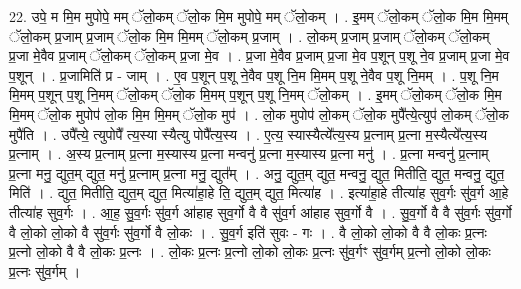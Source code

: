 \documentclass[17pt]{extarticle}
\begin{document}
22. उपे॒ म मि॒म मुपोपे॒ मम् ॅलो॒कम् ॅलो॒क मि॒म मुपोपे॒ मम् ॅलो॒कम् । . इ॒मम् ॅलो॒कम् ॅलो॒क मि॒म मि॒मम् ॅलो॒कम् प्र॒जाम् प्र॒जाम् ॅलो॒क मि॒म मि॒मम् ॅलो॒कम् प्र॒जाम् । . लो॒कम् प्र॒जाम् प्र॒जाम् ॅलो॒कम् ॅलो॒कम् प्र॒जा मे॒वैव प्र॒जाम् ॅलो॒कम् ॅलो॒कम् प्र॒जा मे॒व । . प्र॒जा मे॒वैव प्र॒जाम् प्र॒जा मे॒व प॒शून् प॒शू ने॒व प्र॒जाम् प्र॒जा मे॒व प॒शून् । . प्र॒जामिति॑ प्र - जाम् । . ए॒व प॒शून् प॒शू ने॒वैव प॒शू नि॒म मि॒मम् प॒शू ने॒वैव प॒शू नि॒मम् । . प॒शू नि॒म मि॒मम् प॒शून् प॒शू नि॒मम् ॅलो॒कम् ॅलो॒क मि॒मम् प॒शून् प॒शू नि॒मम् ॅलो॒कम् । . इ॒मम् ॅलो॒कम् ॅलो॒क मि॒म मि॒मम् ॅलो॒क मुपोप॑ लो॒क मि॒म मि॒मम् ॅलो॒क मुप॑ । . लो॒क मुपोप॑ लो॒कम् ॅलो॒क मुपै᳚त्ये॒त्युप॑ लो॒कम् ॅलो॒क मुपै॑ति । . उपै᳚त्ये॒ त्युपोपै᳚ त्य॒स्या स्यैत्यु पोपै᳚त्य॒स्य । . ए॒त्य॒ स्यास्यैत्ये᳚त्य॒स्य प्र॒त्नाम् प्र॒त्ना म॒स्यैत्ये᳚त्य॒स्य प्र॒त्नाम् । . अ॒स्य प्र॒त्नाम् प्र॒त्ना म॒स्यास्य प्र॒त्ना मन्वनु॑ प्र॒त्ना म॒स्यास्य प्र॒त्ना मनु॑ । . प्र॒त्ना मन्वनु॑ प्र॒त्नाम् प्र॒त्ना मनु॒ द्युत॒म् द्युत॒ मनु॑ प्र॒त्नाम् प्र॒त्ना मनु॒ द्युत᳚म् । . अनु॒ द्युत॒म् द्युत॒ मन्वनु॒ द्युत॒ मितीति॒ द्युत॒ मन्वनु॒ द्युत॒ मिति॑ । . द्युत॒ मितीति॒ द्युत॒म् द्युत॒ मित्या॑हा॒हे ति॒ द्युत॒म् द्युत॒ मित्या॑ह । . इत्या॑हा॒हे तीत्या॑ह सुव॒र्गः सु॑व॒र्ग आ॒हे तीत्या॑ह सुव॒र्गः । . आ॒ह॒ सु॒व॒र्गः सु॑व॒र्ग आ॑हाह सुव॒र्गो वै वै सु॑व॒र्ग आ॑हाह सुव॒र्गो वै । . सु॒व॒र्गो वै वै सु॑व॒र्गः सु॑व॒र्गो वै लो॒को लो॒को वै सु॑व॒र्गः सु॑व॒र्गो वै लो॒कः । . सु॒व॒र्ग इति॑ सुवः - गः । . वै लो॒को लो॒को वै वै लो॒कः प्र॒त्नः प्र॒त्नो लो॒को वै वै लो॒कः प्र॒त्नः । . लो॒कः प्र॒त्नः प्र॒त्नो लो॒को लो॒कः प्र॒त्नः सु॑व॒र्गꣳ सु॑व॒र्गम् प्र॒त्नो लो॒को लो॒कः प्र॒त्नः सु॑व॒र्गम् । \newline
\end{document}

